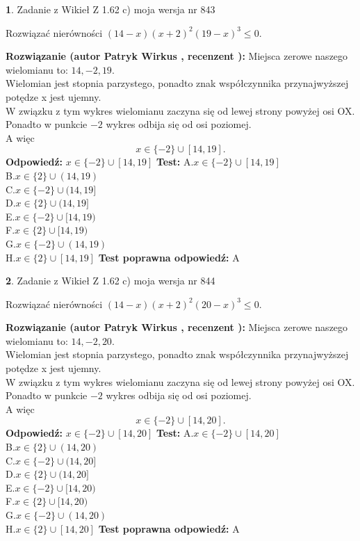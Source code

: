 \documentclass[12pt, a4paper]{article}
\theoremstyle{definition} %
\newtheorem{zad}{}
\newcommand{\zadStart}[1]{\begin{zad}#1\newline}
\newcommand{\zadStop}{\end{zad}}
\newcommand{\rozwStart}[2]{\noindent \textbf{Rozwiązanie (autor #1 , recenzent #2): }\newline}
\newcommand{\rozwStop}{\newline}
\newcommand{\odpStart}{\noindent \textbf{Odpowiedź:}\newline}
\newcommand{\odpStop}{\newline}
\newcommand{\testStart}{\noindent \textbf{Test:}\newline}
\newcommand{\testStop}{\newline}
\newcommand{\kluczStart}{\noindent \textbf{Test poprawna odpowiedź:}\newline}
\newcommand{\kluczStop}{\newline}
\begin{document}
\zadStart{Zadanie z Wikieł Z 1.62 c) moja wersja nr 843}

Rozwiązać nierówności $(14-x)(x+2)^{2}(19-x)^{3}\le0$.
\zadStop
\rozwStart{Patryk Wirkus}{}
Miejsca zerowe naszego wielomianu to: $14, -2, 19$.\\
Wielomian jest stopnia parzystego, ponadto znak współczynnika przy\linebreak najwyższej potędze x jest ujemny.\\ W związku z tym wykres wielomianu zaczyna się od lewej strony powyżej osi OX.\\
Ponadto w punkcie $-2$ wykres odbija się od osi poziomej.\\
A więc $$x \in \{-2\} \cup [14,19].$$
\rozwStop
\odpStart
$x \in \{-2\} \cup [14,19]$
\odpStop
\testStart
A.$x \in \{-2\} \cup [14,19]$\\
B.$x \in \{2\} \cup (14,19)$\\
C.$x \in \{-2\} \cup (14,19]$\\
D.$x \in \{2\} \cup (14,19]$\\
E.$x \in \{-2\} \cup [14,19)$\\
F.$x \in \{2\} \cup [14,19)$\\
G.$x \in \{-2\} \cup (14,19)$\\
H.$x \in \{2\} \cup [14,19]$
\testStop
\kluczStart
A
\kluczStop



\zadStart{Zadanie z Wikieł Z 1.62 c) moja wersja nr 844}

Rozwiązać nierówności $(14-x)(x+2)^{2}(20-x)^{3}\le0$.
\zadStop
\rozwStart{Patryk Wirkus}{}
Miejsca zerowe naszego wielomianu to: $14, -2, 20$.\\
Wielomian jest stopnia parzystego, ponadto znak współczynnika przy\linebreak najwyższej potędze x jest ujemny.\\ W związku z tym wykres wielomianu zaczyna się od lewej strony powyżej osi OX.\\
Ponadto w punkcie $-2$ wykres odbija się od osi poziomej.\\
A więc $$x \in \{-2\} \cup [14,20].$$
\rozwStop
\odpStart
$x \in \{-2\} \cup [14,20]$
\odpStop
\testStart
A.$x \in \{-2\} \cup [14,20]$\\
B.$x \in \{2\} \cup (14,20)$\\
C.$x \in \{-2\} \cup (14,20]$\\
D.$x \in \{2\} \cup (14,20]$\\
E.$x \in \{-2\} \cup [14,20)$\\
F.$x \in \{2\} \cup [14,20)$\\
G.$x \in \{-2\} \cup (14,20)$\\
H.$x \in \{2\} \cup [14,20]$
\testStop
\kluczStart
A
\kluczStop
\end{document}
